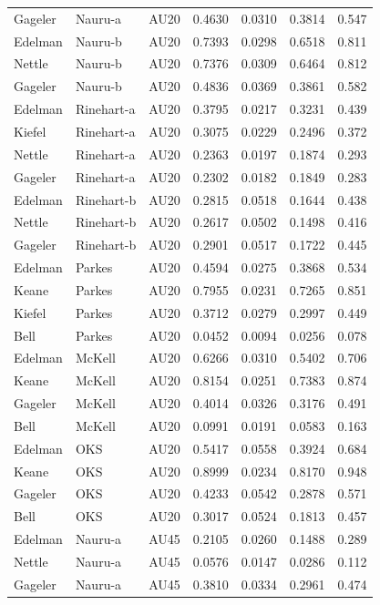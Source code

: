 \documentclass{monashthesis}
\begin{document}
\begin{center}
\begin{longtable}{lllllll}
Gageler & Nauru-a & AU20 & 0.4630 & 0.0310 & 0.3814 & 0.547 \\
Edelman & Nauru-b & AU20 & 0.7393 & 0.0298 & 0.6518 & 0.811 \\
Nettle & Nauru-b & AU20 & 0.7376 & 0.0309 & 0.6464 & 0.812 \\
Gageler & Nauru-b & AU20 & 0.4836 & 0.0369 & 0.3861 & 0.582 \\
Edelman & Rinehart-a & AU20 & 0.3795 & 0.0217 & 0.3231 & 0.439 \\
Kiefel & Rinehart-a & AU20 & 0.3075 & 0.0229 & 0.2496 & 0.372 \\
Nettle & Rinehart-a & AU20 & 0.2363 & 0.0197 & 0.1874 & 0.293 \\
Gageler & Rinehart-a & AU20 & 0.2302 & 0.0182 & 0.1849 & 0.283 \\
Edelman & Rinehart-b & AU20 & 0.2815 & 0.0518 & 0.1644 & 0.438 \\
Nettle & Rinehart-b & AU20 & 0.2617 & 0.0502 & 0.1498 & 0.416 \\
Gageler & Rinehart-b & AU20 & 0.2901 & 0.0517 & 0.1722 & 0.445 \\
Edelman & Parkes & AU20 & 0.4594 & 0.0275 & 0.3868 & 0.534 \\
Keane & Parkes & AU20 & 0.7955 & 0.0231 & 0.7265 & 0.851 \\
Kiefel & Parkes & AU20 & 0.3712 & 0.0279 & 0.2997 & 0.449 \\
Bell & Parkes & AU20 & 0.0452 & 0.0094 & 0.0256 & 0.078 \\
Edelman & McKell & AU20 & 0.6266 & 0.0310 & 0.5402 & 0.706 \\
Keane & McKell & AU20 & 0.8154 & 0.0251 & 0.7383 & 0.874 \\
Gageler & McKell & AU20 & 0.4014 & 0.0326 & 0.3176 & 0.491 \\
Bell & McKell & AU20 & 0.0991 & 0.0191 & 0.0583 & 0.163 \\
Edelman & OKS & AU20 & 0.5417 & 0.0558 & 0.3924 & 0.684 \\
Keane & OKS & AU20 & 0.8999 & 0.0234 & 0.8170 & 0.948 \\
Gageler & OKS & AU20 & 0.4233 & 0.0542 & 0.2878 & 0.571 \\
Bell & OKS & AU20 & 0.3017 & 0.0524 & 0.1813 & 0.457 \\
Edelman & Nauru-a & AU45 & 0.2105 & 0.0260 & 0.1488 & 0.289 \\
Nettle & Nauru-a & AU45 & 0.0576 & 0.0147 & 0.0286 & 0.112 \\
Gageler & Nauru-a & AU45 & 0.3810 & 0.0334 & 0.2961 & 0.474 \\

\end{longtable}
\end{center}
\end{document}
